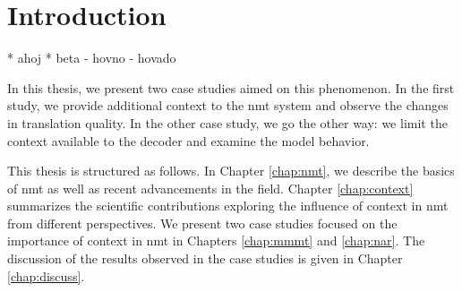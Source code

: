 \chapter{Introduction}
\label{chap:intro}

\begin{markdown}

* ahoj
* beta
    - hovno
    - hovado

\end{markdown}


In this thesis, we present two case studies aimed on this phenomenon. In the
first study, we provide additional context to the \gls{nmt} system and observe
the changes in translation quality. In the other case study, we go the other
way: we limit the context available to the decoder and examine the model
behavior.


This thesis is structured as follows. In Chapter \ref{chap:nmt}, we describe
the basics of \gls{nmt} as well as recent advancements in the field. Chapter
\ref{chap:context} summarizes the scientific contributions exploring the
influence of context in \gls{nmt} from different perspectives. We present two
case studies focused on the importance of context in \gls{nmt} in Chapters
\ref{chap:mmmt} and \ref{chap:nar}. The discussion of the results observed in
the case studies is given in Chapter \ref{chap:discuss}.
